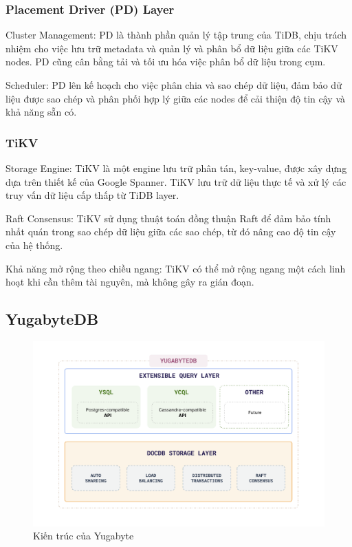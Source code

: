 \documentclass{extreport}[13.5pt, oneside,a4paper]
\begin{document}
\subsubsection{Placement Driver (PD) Layer}

Cluster Management: PD là thành phần quản lý tập trung của TiDB, chịu trách nhiệm cho việc lưu trữ metadata và quản lý và phân bổ dữ liệu giữa các TiKV nodes. PD cũng cân bằng tải và tối ưu hóa việc phân bổ dữ liệu trong cụm.

Scheduler: PD lên kế hoạch cho việc phân chia và sao chép dữ liệu, đảm bảo dữ liệu được sao chép và phân phối hợp lý giữa các nodes để cải thiện độ tin cậy và khả năng sẵn có.


\subsubsection{TiKV}

Storage Engine: TiKV là một engine lưu trữ phân tán, key-value, được xây dựng dựa trên thiết kế của Google Spanner. TiKV lưu trữ dữ liệu thực tế và xử lý các truy vấn dữ liệu cấp thấp từ TiDB layer.

Raft Consensus: TiKV sử dụng thuật toán đồng thuận Raft để đảm bảo tính nhất quán trong sao chép dữ liệu giữa các sao chép, từ đó nâng cao độ tin cậy của hệ thống.

Khả năng mở rộng theo chiều ngang: TiKV có thể mở rộng ngang một cách linh hoạt khi cần thêm tài nguyên, mà không gây ra gián đoạn.

\subsection{YugabyteDB}

\begin{figure}
    \centering
    \includegraphics[width=0.8\linewidth]{YugaArchitecture.png}
    \caption{Kiến trúc của Yugabyte \protect\footnotemark}
    \label{fig:YugaArchitecture}
\end{figure}
\end{document}
